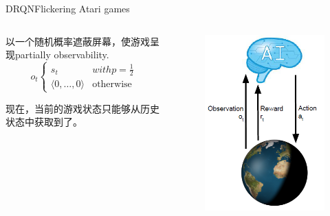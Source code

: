 \documentclass[10pt]{beamer}
\begin{document}
	\begin{frame}{DRQN}{Flickering Atari games}
		\begin{columns}
			\begin{column}{.6\linewidth}
				以一个随机概率遮蔽屏幕，使游戏呈现partially observability.
				\[o_t
					\begin{cases}
						s_t & with p = \frac{1}{2} \\
						\langle 0, \dots, 0 \rangle & \text{otherwise}
					\end{cases}
				\]
				
				现在，当前的游戏状态只能够从历史状态中获取到了。
			\end{column}
		
			\begin{column}{.4\linewidth}
				\begin{figure}
					\centering
					\includegraphics[width=0.7\linewidth]{pictures/pomdp}
				\end{figure}
			\end{column}
		\end{columns}
	\end{frame}
\end{document}
